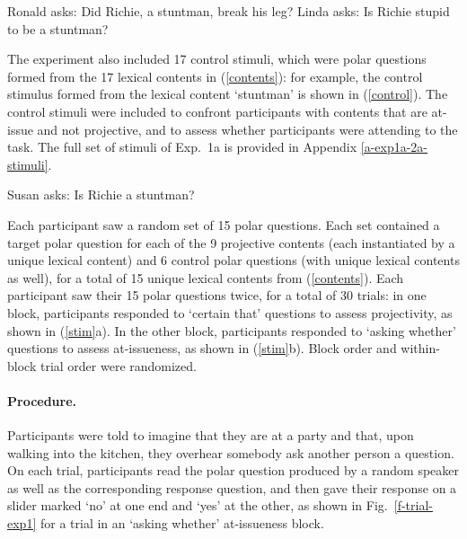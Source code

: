 \documentclass[11pt,fleqn]{article}
\newcommand{\6}{\mbox{$[\hspace*{-.6mm}[$}}
\newcommand{\9}{\mbox{$]\hspace*{-.6mm}]$}}
\newcommand{\figref}[1]{Fig.~\ref{#1}}
\begin{document}
\begin{exe}
\ex\label{target}
\begin{xlist}
\ex Ronald asks: Did Richie, a stuntman, break his leg?
\ex Linda asks: Is Richie stupid to be a stuntman?
\end{xlist}
\end{exe}

The experiment also included 17 control stimuli, which were polar questions formed from the 17 lexical contents in (\ref{contents}): for example, the control stimulus formed from the lexical content `stuntman' is shown in (\ref{control}). The control stimuli were included to confront participants with contents that are at-issue and not projective, and to assess whether participants were attending to the task. The full set of stimuli of Exp.~1a is provided in Appendix \ref{a-exp1a-2a-stimuli}.

\begin{exe}
\ex\label{control} Susan asks: Is Richie a stuntman?
\end{exe}


Each participant saw a random set of 15 polar questions. Each set contained a target polar question for each of the 9 projective contents (each instantiated by a unique lexical content) and 6 control polar questions (with unique lexical contents as well), for a total of 15 unique lexical contents from (\ref{contents}). Each participant saw their 15 polar questions twice, for a total of 30 trials: in one block, participants responded to `certain that' questions to assess projectivity, as shown in (\ref{stim}a). In the other block, participants responded to `asking whether' questions to assess at-issueness, as shown in (\ref{stim}b). Block order and within-block trial order were randomized.

\paragraph{Procedure.} Participants were told to imagine that they are at a party and that, upon walking into the kitchen, they overhear somebody ask another person a question. On each trial, participants read the polar question produced by a random speaker as well as the corresponding response question, and then gave their response on a slider marked `no' at one end and `yes' at the other, as shown in \figref{f-trial-exp1} for a trial in an `asking whether' at-issueness block.  
\end{document}
